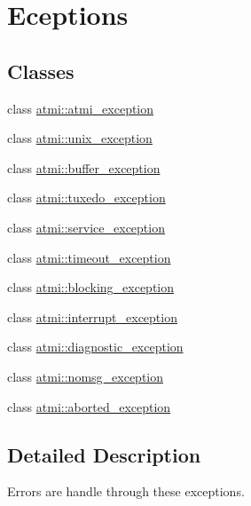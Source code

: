 \hypertarget{group__errors}{}\section{Eceptions}
\label{group__errors}
\subsection*{Classes}
\begin{DoxyCompactItemize}
\item 
class \hyperlink{classatmi_1_1atmi__exception}{atmi\+::atmi\+\_\+exception}
\item 
class \hyperlink{classatmi_1_1unix__exception}{atmi\+::unix\+\_\+exception}
\item 
class \hyperlink{classatmi_1_1buffer__exception}{atmi\+::buffer\+\_\+exception}
\item 
class \hyperlink{classatmi_1_1tuxedo__exception}{atmi\+::tuxedo\+\_\+exception}
\item 
class \hyperlink{classatmi_1_1service__exception}{atmi\+::service\+\_\+exception}
\item 
class \hyperlink{classatmi_1_1timeout__exception}{atmi\+::timeout\+\_\+exception}
\item 
class \hyperlink{classatmi_1_1blocking__exception}{atmi\+::blocking\+\_\+exception}
\item 
class \hyperlink{classatmi_1_1interrupt__exception}{atmi\+::interrupt\+\_\+exception}
\item 
class \hyperlink{classatmi_1_1diagnostic__exception}{atmi\+::diagnostic\+\_\+exception}
\item 
class \hyperlink{classatmi_1_1nomsg__exception}{atmi\+::nomsg\+\_\+exception}
\item 
class \hyperlink{classatmi_1_1aborted__exception}{atmi\+::aborted\+\_\+exception}
\end{DoxyCompactItemize}


\subsection{Detailed Description}
Errors are handle through these exceptions. 